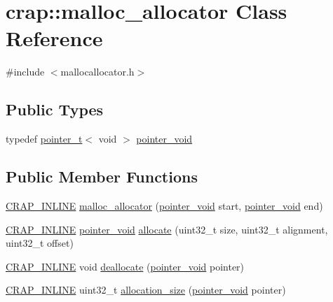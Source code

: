 \hypertarget{classcrap_1_1malloc__allocator}{}\section{crap\+:\+:malloc\+\_\+allocator Class Reference}
\label{classcrap_1_1malloc__allocator}


{\ttfamily \#include $<$mallocallocator.\+h$>$}

\subsection*{Public Types}
\begin{DoxyCompactItemize}
\item 
typedef \hyperlink{structcrap_1_1pointer__t}{pointer\+\_\+t}$<$ void $>$ \hyperlink{classcrap_1_1malloc__allocator_a9e5d7117b39a74b329c4921a3658e1f3}{pointer\+\_\+void}
\end{DoxyCompactItemize}
\subsection*{Public Member Functions}
\begin{DoxyCompactItemize}
\item 
\hyperlink{config__x86_8h_a5a40526b8d842e7ff731509998bb0f1c}{C\+R\+A\+P\+\_\+\+I\+N\+L\+I\+N\+E} \hyperlink{classcrap_1_1malloc__allocator_a76d0d7444b136b8f4b96e9e7d53aae73}{malloc\+\_\+allocator} (\hyperlink{classcrap_1_1malloc__allocator_a9e5d7117b39a74b329c4921a3658e1f3}{pointer\+\_\+void} start, \hyperlink{classcrap_1_1malloc__allocator_a9e5d7117b39a74b329c4921a3658e1f3}{pointer\+\_\+void} end)
\item 
\hyperlink{config__x86_8h_a5a40526b8d842e7ff731509998bb0f1c}{C\+R\+A\+P\+\_\+\+I\+N\+L\+I\+N\+E} \hyperlink{classcrap_1_1malloc__allocator_a9e5d7117b39a74b329c4921a3658e1f3}{pointer\+\_\+void} \hyperlink{classcrap_1_1malloc__allocator_a7f94e6d7f20e95fb53f7736b44bf20a9}{allocate} (uint32\+\_\+t size, uint32\+\_\+t alignment, uint32\+\_\+t offset)
\item 
\hyperlink{config__x86_8h_a5a40526b8d842e7ff731509998bb0f1c}{C\+R\+A\+P\+\_\+\+I\+N\+L\+I\+N\+E} void \hyperlink{classcrap_1_1malloc__allocator_a992362ce820e00fb866e2a0f3a4a4f63}{deallocate} (\hyperlink{classcrap_1_1malloc__allocator_a9e5d7117b39a74b329c4921a3658e1f3}{pointer\+\_\+void} pointer)
\item 
\hyperlink{config__x86_8h_a5a40526b8d842e7ff731509998bb0f1c}{C\+R\+A\+P\+\_\+\+I\+N\+L\+I\+N\+E} uint32\+\_\+t \hyperlink{classcrap_1_1malloc__allocator_a2cdde6f48fdde99c21c7dd8a440f853d}{allocation\+\_\+size} (\hyperlink{classcrap_1_1malloc__allocator_a9e5d7117b39a74b329c4921a3658e1f3}{pointer\+\_\+void} pointer)
\end{DoxyCompactItemize}


